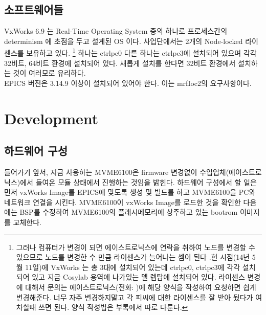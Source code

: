 \documentclass[11pt,a4paper]{article}
\begin{document}
\subsection{소프트웨어들}
VxWorks 6.9 는 Real-Time Operating System 중의 하나로 프로세스간의 determinism 에 초점을 두고 설계된 OS 이다.
사업단에서는 2개의 Node-locked 라이센스를 보유하고 있다.
\footnote{그러나 컴퓨터가 변경이 되면 에이스트로닉스에 연락을 취하여 노드를 변경할 수 있으므로 노드를 변경한 수 
만큼 라이센스가 늘어나는 셈이 된다 .현 시점(14년 5월 11일)에 VxWorks 는 총 3대에 설치되어 있는데 
ctrlpc0, ctrlpc3에 각각 설치되어 있고 지금 Cosylab 용역에 나가있는 델 렙탑에 설치되어 있다. 
라이센스 변경에 대해서 문의는 에이스트로닉스(전화: )에 해당 양식을 작성하여 요청하면
쉽게 변경해준다. 너무 자주 변경하지말고 각 피씨에 대한 라이센스를 잘 받아 뒀다가 여차할때 쓰면 된다.
양식 작성법은 부록에서 따로 다룬다.}
하나는 ctrlpc0 다른 하나는 ctrlpc3에 설치되어 있으며 각각 32비트, 64비트 환경에 설치되어 있다. 
새롭게 설치를 한다면 32비트 환경에서 설치하는 것이 여러모로 유리하다. \\

EPICS 버전은 3.14.9 이상이 설치되어 있어야 한다. 이는 mrfIoc2의 요구사항이다.
\section{Development}
\subsection{하드웨어 구성}
들어가기 앞서, 지금 사용하는 MVME6100은 firmware 변경없이 수입업체(에이스트로닉스)에서 들여온 모듈 상태에서 진행하는 것임을 밝힌다.
하드웨어 구성에서 할 일은 먼저 vxWorks Image를 EPICS에 맞도록 생성 및 빌드를 하고 MVME6100을 PC와 네트워크 연결을 시킨다. 
MVME6100이 vxWorks Image를 로드한 것을 확인한 다음에는 BSP를 수정하여 MVME6100의 플래시메모리에 상주하고 있는 bootrom 이미지를 
교체한다.
\end{document}
